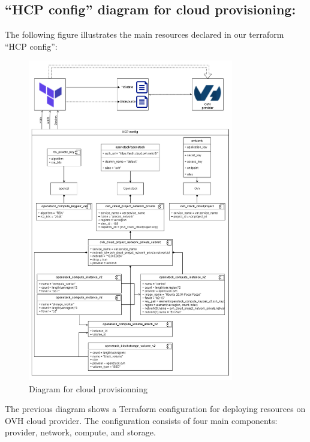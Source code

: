\subsection{“HCP config” diagram for cloud provisioning: }

\hspace{7mm}The following figure illustrates the main resources declared in our terraform “HCP config”: 

\begin{figure}[H]\centering
\includegraphics[width=0.8\textwidth]{assets/f14.png}
\caption{Diagram for cloud provisionning}
\label{fig:fig14}
\end{figure}
\newpage
\hspace{7mm}The previous diagram shows a Terraform configuration for deploying resources on OVH cloud provider. The configuration consists of four main components: provider, network, compute, and storage. 

